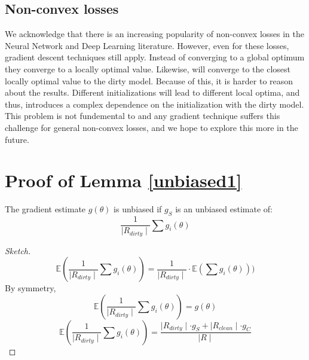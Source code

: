 \subsection{Non-convex losses}\label{non-convex}
We acknowledge that there is an increasing popularity of non-convex losses in the Neural Network and Deep Learning literature. 
However, even for these losses, gradient descent techniques still apply. 
Instead of converging to a global optimum they converge to a locally optimal value. 
Likewise, \sys will converge to the closest locally optimal value to the dirty model. 
Because of this, it is harder to reason about the results.
Different initializations will lead to different local optima, and thus, introduces a complex dependence on the initialization with the dirty model.
This problem is not fundemental to \sys and any gradient technique suffers this challenge for general non-convex losses, and we hope to explore this more in the future.

\section{Proof of Lemma \ref{unbiased1}}\label{unbiased1-deriv}
\begin{lemma}
The gradient estimate $g(\theta)$ is unbiased if $g_S$ is an unbiased estimate of:
\[
\frac{1}{\mid R_{dirty} \mid} \sum g_i(\theta)
\]
\end{lemma}
\begin{proof}[Sketch]
\[
\mathbb{E}(\frac{1}{\mid R_{dirty} \mid} \sum g_i(\theta)) = \frac{1}{\mid R_{dirty} \mid} \cdot \mathbb{E}(\sum g_i(\theta)))
\]
By symmetry, 
\[
\mathbb{E}(\frac{1}{\mid R_{dirty} \mid} \sum g_i(\theta)) = g(\theta)
\]
\[
\mathbb{E}(\frac{1}{\mid R_{dirty} \mid} \sum g_i(\theta)) = \frac{\mid R_{dirty} \mid \cdot g_S + \mid R_{clean} \mid \cdot g_C  }{\mid R \mid}
\]
\end{proof}

